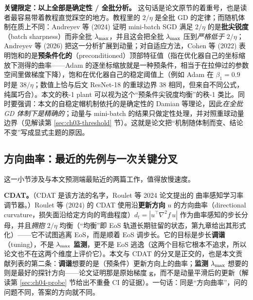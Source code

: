 \textbf{关键限定：以上全部是确定性 / 全批分析。}
这句话是论文原节的着重号，也是读者最容易带着教程直觉踩空的地方。教程里的 $2/\eta$
是全批 GD 的定律；而随机体制在质上不同：Andreyev 等 (2024) 证明 mini-batch SGD 满足
$2/\eta$ 的是\textbf{批尖锐度}（batch sharpness）而非全批 $\lambda_{\max}$，并且这会把全批
$\lambda_{\max}$ 压到\emph{严格低于} $2/\eta$；Andreyev 等 (2026)
把这一分析扩展到动量；对自适应方法，Cohen 等 (2022)
表明饱和的是\textbf{预条件化的}（preconditioned）顶部特征值（指在优化器自己的坐标缩放下测得的曲率——Adam 的逐坐标缩放就是一种预条件，相当于在拉伸过的参数空间里做梯度下降），饱和在优化器自己的稳定阈值上（例如 Adam
在 $\beta_1{=}0.9$ 时是 $38/\eta$；数值上恰与后文 ResNet-18 的重球边界 38 相同，但来自不同公式，纯属巧合）。本文的秩-1 plant
可以视为这个“预条件尖锐度均衡”的秩-1
类比。同时要强调：本文的自稳定帽机制依托的是确定性的 Damian 等理论，因此\emph{在全批
GD 体制下是精确的}；动量与 mini-batch
的结果只做定性处理，并对照重球动量边界（见解读第 \ref{sec:ch03-threshold}
节）。这就是论文把“机制随体制而变、结论不变”写成显式主题的原因。

\subsection{方向曲率：最近的先例与一次关键分叉}
\label{sec:ch02-directional}

这一小节涉及与本文预测端最贴近的两篇工作，值得放慢速度。

\textbf{CDAT。}（CDAT 是该方法的名字，Roulet 等 2024 论文提出的
曲率感知学习率调节器。）Roulet 等 (2024) 的 CDAT 使用沿\textbf{更新方向} $u$ 的方向曲率（directional curvature，损失面沿给定方向的弯曲程度）$d_t
= |u^{\top}\nabla^{2} f\, u|$ 作为曲率感知的步长分母，并且\emph{拥抱} $2/\eta$
均衡（``均衡''即 EoS 轨道长期驻留的状态，第九章给出其形式化）——它不试图逃离 EoS，而是顺着 EoS
调步长。它的目标是步长\textbf{调谐}（tuning），不是 $\lambda_{\max}$ \textbf{监测}，更不是
EoS 逃逸（这两个目标它根本不追求，所以论文也不在这两个维度上评价它）。本文与 CDAT
的分叉是正交的，也是本文贡献列表的第二条：\textbf{调谐}想要的是（预条件）更新方向上的曲率；\textbf{监测}
$\lambda_{\max}$ 想要的则是最好的探针方向——论文证明那是原始梯度
$\mathbf{g}$，而不是动量平滑后的更新（解读第 \ref{sec:ch04-probe} 节给出不重叠 CI
的证据）。一句话：同是“方向曲率”，问的问题不同，答案的方向就不同。

